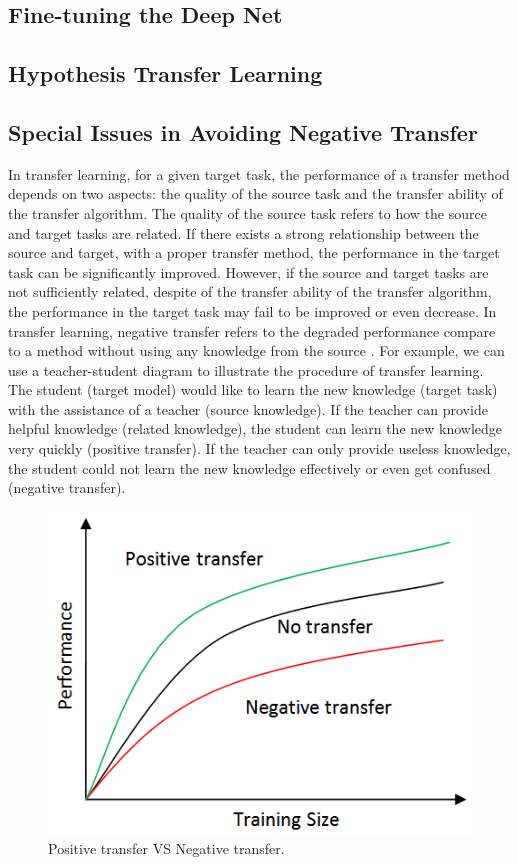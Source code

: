 \subsection{Fine-tuning the Deep Net}

\subsection{Hypothesis Transfer Learning}



\subsection{Special Issues in Avoiding Negative Transfer}
In transfer learning, for a given target task, the performance of a transfer method depends on two aspects: the quality of the source task and the transfer ability of the transfer algorithm. The quality of the source task refers to how the source and target tasks are related. If there exists a strong relationship between the source and target, with a proper transfer method, the performance in the target task can be significantly improved. However, if the source and target tasks are not sufficiently related, despite of the transfer ability of the transfer algorithm, the performance in the target task may fail to be improved or even decrease. In transfer learning, negative transfer refers to the degraded performance compare to a method without using any knowledge from the source \cite{pan2010survey}. 
For example, we can use a teacher-student diagram to illustrate the procedure of transfer learning. The student (target model) would like to learn the new knowledge (target task) with the assistance of a teacher (source knowledge). If the teacher can provide helpful knowledge (related knowledge), the student can learn the new knowledge very quickly (positive transfer). If the teacher can only provide useless knowledge, the student could not learn the new knowledge effectively or even get confused (negative transfer).

\begin{figure}
\centering
\includegraphics[scale=.7]{relatedwork/fig/negative.png}
\caption{Positive transfer VS Negative transfer.}
\end{figure}

